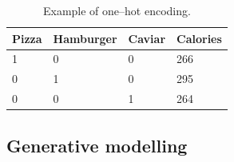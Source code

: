 \begin{table}[h]
	\centering
	\begin{tabular}{|l|l|l|l|}
		\hline
		Pizza & Hamburger & Caviar & Calories \\ \hline
		1     & 0         & 0      & 266      \\ \hline
		0     & 1         & 0      & 295      \\ \hline
		0     & 0         & 1      & 264      \\ \hline
	\end{tabular}
	\caption{Example of one--hot encoding.}
	\label{tab:OHE}
\end{table}
\subsection{Generative modelling}
